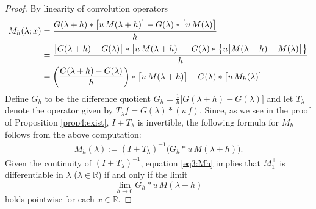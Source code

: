 \documentclass[../dissertation.tex]{subfiles}
\begin{document}
\begin{proof}
	By linearity of convolution operators 
	\begin{align*}
		M_h(\lambda; x)
			&= 
				\frac{
					G(\lambda+h)* \big[u\,M(\lambda+h)\big]
					-G(\lambda) * \big[u\,M(\lambda)\big]
				}
				{h} \\[.1\baselineskip]
			&= 
				\frac{
					\big[
						G(\lambda+h) - G(\lambda)
					\big]
						* \big[u\,M(\lambda+h)\big]
					- G(\lambda) 
						* 
							\big\{
								u
								\big[
									M(\lambda+h)
									-M(\lambda)
								\big]
							\big\}
				}
				{h} \\
			&= 
				\left(
					\frac{G(\lambda+h)-G(\lambda)}{h}
				\right)
					* \big[u\,M(\lambda+h)\big]
				- G(\lambda) 
					* \big[ u \, M_h(\lambda) \big]
	\end{align*}
	Define $G_h$ to be the dif{}ference quotient 
	$G_h = \frac{1}{h}\big[G(\lambda+h) - G(\lambda)\big]$ and let 
	$T_\lambda$ denote the operator given by $T_\lambda f = G(\lambda)*(u\,f)$.
	Since, as we see in the proof of Proposition \ref{prop4:exist}, $I + T_\lambda$
	is invertible, the following formula for $M_h$ follows from the above 
	computation:
	\begin{align}\label{eq3:Mh}
		M_h(\lambda) := (I + T_\lambda)^{-1} \big(G_h * u\, M(\lambda+h)\big).
	\end{align}
	Given the continuity of $(I + T_\lambda)^{-1}$, equation \eqref{eq3:Mh}
	implies that $M_1^+$ is dif{}ferentiable in $\lambda$ ($\lambda \in \mathbb R$)
	if and only if the limit 
	\[
		\lim_{h\to0} G_h * u\, M(\lambda+h)
	\]
	holds pointwise for each $x \in \mathbb R$. 


\end{proof}
\end{document}
